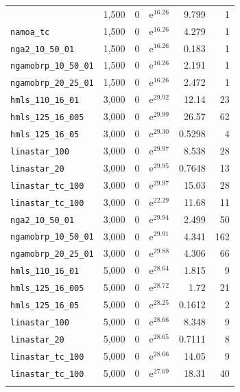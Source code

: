 \begin{longtable}{|l|r|r|r|r|r|}
{    \texttt{linastar\_tc\_100} & 1,500 & 0 & $\mathrm{e}^{16.26}$ & 9.799 & 1 \\
    \texttt{namoa\_tc} & 1,500 & 0 & $\mathrm{e}^{16.26}$ & 4.279 & 1 \\
    \texttt{nga2\_10\_50\_01} & 1,500 & 0 & $\mathrm{e}^{16.26}$ & 0.183 & 1 \\
    \texttt{ngamobrp\_10\_50\_01} & 1,500 & 0 & $\mathrm{e}^{16.26}$ & 2.191 & 1 \\
    \texttt{ngamobrp\_20\_25\_01} & 1,500 & 0 & $\mathrm{e}^{16.26}$ & 2.472 & 1 \\
    \texttt{hmls\_110\_16\_01} & 3,000 & 0 & $\mathrm{e}^{29.92}$ & 12.14 & 23 \\
    \texttt{hmls\_125\_16\_005} & 3,000 & 0 & $\mathrm{e}^{29.99}$ & 26.57 & 62 \\
    \texttt{hmls\_125\_16\_05} & 3,000 & 0 & $\mathrm{e}^{29.30}$ & 0.5298 & 4 \\
    \texttt{linastar\_100} & 3,000 & 0 & $\mathrm{e}^{29.97}$ & 8.538 & 28 \\
    \texttt{linastar\_20} & 3,000 & 0 & $\mathrm{e}^{29.95}$ & 0.7648 & 13 \\
    \texttt{linastar\_tc\_100} & 3,000 & 0 & $\mathrm{e}^{29.97}$ & 15.03 & 28 \\
    \texttt{linastar\_tc\_100} & 3,000 & 0 & $\mathrm{e}^{22.29}$ & 11.68 & 11 \\
    \texttt{nga2\_10\_50\_01} & 3,000 & 0 & $\mathrm{e}^{29.94}$ & 2.499 & 50 \\
    \texttt{ngamobrp\_10\_50\_01} & 3,000 & 0 & $\mathrm{e}^{29.91}$ & 4.341 & 162 \\
    \texttt{ngamobrp\_20\_25\_01} & 3,000 & 0 & $\mathrm{e}^{29.88}$ & 4.306 & 66 \\
    \texttt{hmls\_110\_16\_01} & 5,000 & 0 & $\mathrm{e}^{28.64}$ & 1.815 & 9 \\
    \texttt{hmls\_125\_16\_005} & 5,000 & 0 & $\mathrm{e}^{28.72}$ & 1.72 & 21 \\
    \texttt{hmls\_125\_16\_05} & 5,000 & 0 & $\mathrm{e}^{28.25}$ & 0.1612 & 2 \\
    \texttt{linastar\_100} & 5,000 & 0 & $\mathrm{e}^{28.66}$ & 8.348 & 9 \\
    \texttt{linastar\_20} & 5,000 & 0 & $\mathrm{e}^{28.65}$ & 0.7111 & 8 \\
    \texttt{linastar\_tc\_100} & 5,000 & 0 & $\mathrm{e}^{28.66}$ & 14.05 & 9 \\
    \texttt{linastar\_tc\_100} & 5,000 & 0 & $\mathrm{e}^{27.69}$ & 18.31 & 40 \\
}
\end{longtable}
